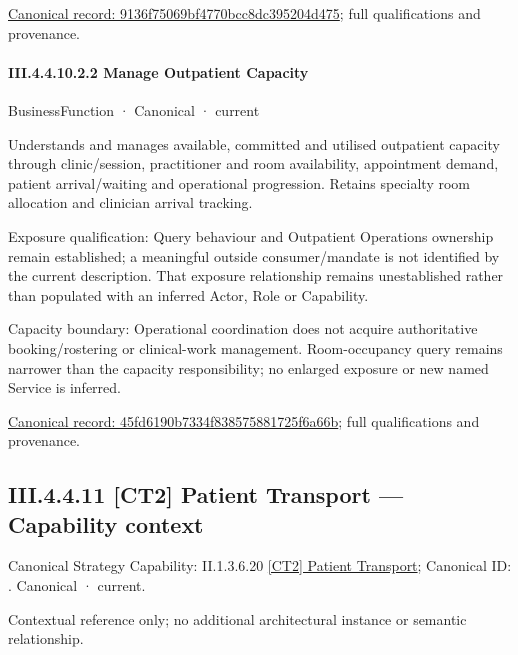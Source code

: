 {\footnotesize \href{../../../../continuum/business/business-function/9136f75069bf4770bcc8dc395204d475.md}{Canonical record: 9136f75069bf4770bcc8dc395204d475}; full qualifications and provenance.}\par
\paragraph*{III.4.4.10.2.2 Manage Outpatient Capacity}
\label{navigation:III.4.4.10.2.2}

\label{element:45fd6190b7334f838575881725f6a66b}
{\small BusinessFunction · Canonical · current}\par

Understands and manages available, committed and utilised outpatient capacity through clinic/session, practitioner and room availability, appointment demand, patient arrival/waiting and operational progression. Retains specialty room allocation and clinician arrival tracking.



Exposure qualification: Query behaviour and Outpatient Operations ownership remain established; a meaningful outside consumer/mandate is not identified by the current description. That exposure relationship remains unestablished rather than populated with an inferred Actor, Role or Capability.



Capacity boundary: Operational coordination does not acquire authoritative booking/rostering or clinical-work management. Room-occupancy query remains narrower than the capacity responsibility; no enlarged exposure or new named Service is inferred.


{\footnotesize \href{../../../../continuum/business/business-function/45fd6190b7334f838575881725f6a66b.md}{Canonical record: 45fd6190b7334f838575881725f6a66b}; full qualifications and provenance.}\par
\subsection*{III.4.4.11 [CT2] Patient Transport — Capability context}
\label{navigation:III.4.4.11}

{\small Canonical Strategy Capability: II.1.3.6.20 \hyperref[element:6041d7c0cc5d4519aaea584bb4e6d365]{[CT2] Patient Transport}; Canonical ID: \texttt{}. Canonical · current.}\par
Contextual reference only; no additional architectural instance or semantic relationship.\par
